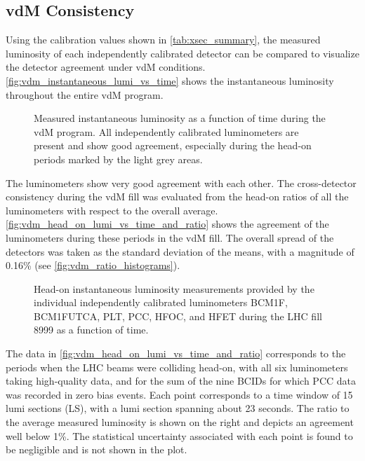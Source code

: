 \newpage

\subsection{vdM Consistency}
\label{subsec:vdm_consistency}

Using the calibration values shown in \autoref{tab:xsec_summary}, the measured luminosity of each independently calibrated detector can be compared to visualize the detector agreement under vdM conditions. \autoref{fig:vdm_instantaneous_lumi_vs_time} shows the instantaneous luminosity throughout the entire vdM program.

\begin{figure}[!htb]
	\centering
	\caption[Instantaneous luminosity during vdM]{Measured instantaneous luminosity as a function of time during the vdM program. All independently calibrated luminometers are present and show good agreement, especially during the head-on periods marked by the light grey areas.}
	\label{fig:vdm_instantaneous_lumi_vs_time}
\end{figure}

The luminometers show very good agreement with each other. The cross-detector consistency during the vdM fill was evaluated from the head-on ratios of all the luminometers with respect to the overall average. \autoref{fig:vdm_head_on_lumi_vs_time_and_ratio} shows the agreement of the luminometers during these periods in the vdM fill. The overall spread of the detectors was taken as the standard deviation of the means, with a magnitude of 0.16\% (see \autoref{fig:vdm_ratio_histograms}).

\begin{figure}[!htb]
	\centering
	\caption[Comparison of head-on luminosity measurements]{Head-on instantaneous luminosity measurements provided by the individual independently calibrated luminometers BCM1F, BCM1FUTCA, PLT, PCC, HFOC, and HFET during the LHC fill 8999 as a function of time.}
	\label{fig:vdm_head_on_lumi_vs_time_and_ratio}
\end{figure}

The data in \autoref{fig:vdm_head_on_lumi_vs_time_and_ratio} corresponds to the periods when the LHC beams were colliding head-on, with all six luminometers taking high-quality data, and for the sum of the nine BCIDs for which PCC data was recorded in zero bias events. Each point corresponds to a time window of 15 lumi sections (LS), with a lumi section spanning about 23 seconds. The ratio to the average measured luminosity is shown on the right and depicts an agreement well below 1\%. The statistical uncertainty associated with each point is found to be negligible and is not shown in the plot.

